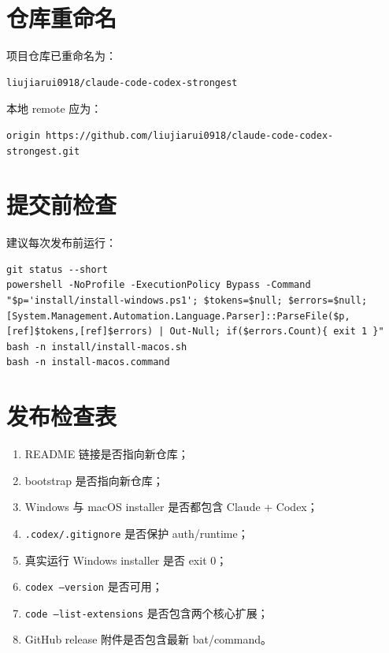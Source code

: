 \documentclass[11pt,a4paper]{ctexbook}
\begin{document}
\section{仓库重命名}

项目仓库已重命名为：

\begin{lstlisting}[language={}]
liujiarui0918/claude-code-codex-strongest
\end{lstlisting}

本地 remote 应为：

\begin{lstlisting}[language={}]
origin https://github.com/liujiarui0918/claude-code-codex-strongest.git
\end{lstlisting}

\section{提交前检查}

建议每次发布前运行：

\begin{lstlisting}[language={}]
git status --short
powershell -NoProfile -ExecutionPolicy Bypass -Command "$p='install/install-windows.ps1'; $tokens=$null; $errors=$null; [System.Management.Automation.Language.Parser]::ParseFile($p,[ref]$tokens,[ref]$errors) | Out-Null; if($errors.Count){ exit 1 }"
bash -n install/install-macos.sh
bash -n install-macos.command
\end{lstlisting}

\section{发布检查表}

\begin{enumerate}[leftmargin=2em]
  \item README 链接是否指向新仓库；
  \item bootstrap 是否指向新仓库；
  \item Windows 与 macOS installer 是否都包含 Claude + Codex；
  \item \texttt{.codex/.gitignore} 是否保护 auth/runtime；
  \item 真实运行 Windows installer 是否 exit 0；
  \item \texttt{codex --version} 是否可用；
  \item \texttt{code --list-extensions} 是否包含两个核心扩展；
  \item GitHub release 附件是否包含最新 bat/command。
\end{enumerate}
\end{document}
